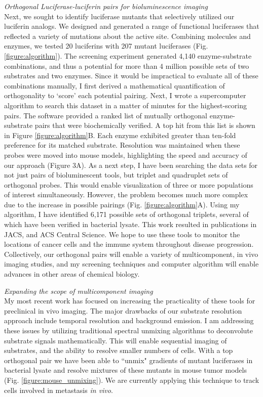 \documentclass[11pt]{article}
\begin{document}
\textit{Orthogonal Luciferase-luciferin pairs for bioluminescence imaging}\\
Next, we sought to identify luciferase mutants that selectively utilized our luciferin analogs. We designed and generated a range of functional luciferases that reflected a variety of mutations about the active site. Combining molecules and enzymes, we tested 20 luciferins with 207 mutant luciferases (Fig. \ref{figure:algorithm}). The screening experiment generated 4,140 enzyme-substrate combinations, and thus a potential for more than 4 million possible sets of two substrates and two enzymes. Since it would be impractical to evaluate all of these combinations manually, I first derived a mathematical quantification of orthogonality to ‘score’ each potential pairing. Next, I wrote a supercomputer algorithm to search this dataset in a matter of minutes for the highest-scoring pairs. The software provided a ranked list of mutually orthogonal enzyme-substrate pairs that were biochemically verified. A top hit from this list is shown in Figure \ref{figure:algorithm}B. Each enzyme exhibited greater than ten-fold preference for its matched substrate. Resolution was maintained when these probes were moved into mouse models, highlighting the speed and accuracy of our approach (Figure 3A). As a next step, I have been searching the data sets for not just pairs of bioluminescent tools, but triplet and quadruplet sets of orthogonal probes. This would enable visualization of three or more populations of interest simultaneously. However, the problem becomes much more complex due to the increase in possible pairings (Fig. \ref{figure:algorithm}A). Using my algorithm, I have identified 6,171 possible sets of orthogonal triplets, several of which have been verified in bacterial lysate. This work resulted in publications in JACS, and ACS Central Science. We hope to use these tools to monitor the locations of cancer cells and the immune system throughout disease progression. Collectively, our orthogonal pairs will enable a variety of multicomponent, in vivo imaging studies, and my screening techniques and computer algorithm will enable advances in other areas of chemical biology.

\textit{Expanding the scope of multicomponent imaging}\\
My most recent work has focused on increasing the practicality of these tools for preclinical in vivo imaging. The major drawbacks of our substrate resolution approach include temporal resolution and background emission. I am addressing these issues by utilizing traditional spectral unmixing algorithms to deconvolute substrate signals mathematically. This will enable sequential imaging of substrates, and the ability to resolve smaller numbers of cells. With a top orthogonal pair we have been able to ``unmix" gradients of mutant luciferases in bacterial lysate and resolve mixtures of these mutants in mouse tumor models (Fig. \ref{figure:mouse_unmixing}). We are currently applying this technique to track cells involved in metastasis \textit{in vivo}. %
\end{document}
